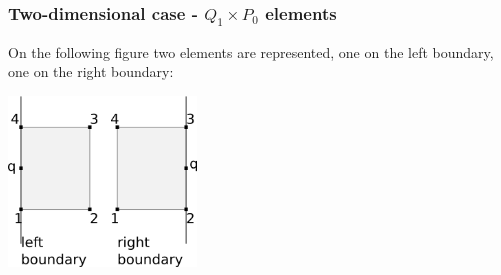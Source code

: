 \subsubsection{Two-dimensional case - $Q_1 \times P_0$ elements}

On the following figure two elements are represented, one on the 
left boundary, one on the right boundary:
\begin{center}
\includegraphics[width=5cm]{images/openbc/drawing.png}
\end{center}


